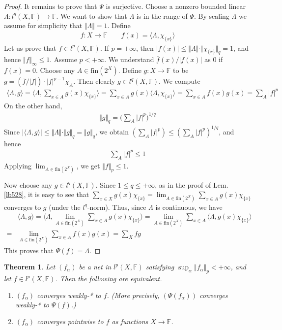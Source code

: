 \documentclass[12pt,b5paper,notitlepage]{article}
\theoremstyle{definition}
\theoremstyle{plain}
\newtheorem{thm}[df]{Theorem}
\newcommand{\ovl}{\overline}
\newcommand{\bk}[1]{\langle {#1}\rangle}
\newcommand{\bigbk}[1]{\big\langle {#1}\big\rangle}
\newcommand{\Bigbk}[1]{\Big\langle {#1}\Big\rangle}
\newcommand{\fin}{\mathrm{fin}}
\newcommand{\Fbb}{\mathbb F}
\numberwithin{equation}{section}
\begin{document}
\begin{proof}
It remains to prove that $\Psi$ is surjective. Choose a nonzero bounded linear $\Lambda:l^q(X,\Fbb)\rightarrow\Fbb$. We want to show that $\Lambda$ is in the range of $\Psi$. By scaling $\Lambda$ we assume for simplicity that $\Vert\Lambda\Vert=1$.  Define 
\begin{align}
f:X\rightarrow\Fbb\qquad  f(x)=\bk{\Lambda,\chi_{\{x\}}}
\end{align}
Let us prove that $f\in l^p(X,\Fbb)$. If $p=+\infty$, then $|f(x)|\leq \Vert\Lambda\Vert\cdot\Vert\chi_{\{x\}}\Vert_q=1$, and hence $\Vert f\Vert_\infty\leq 1$. Assume $p<+\infty$. We understand $\ovl f(x)/|f(x)|$ as $0$ if $f(x)=0$. Choose any $A\in\fin(2^X)$. Define $g:X\rightarrow\Fbb$ to be $g=(\ovl f/|f|)\cdot |f|^{p-1}\chi_A$. Then clearly $g\in l^q(X,\Fbb)$. We compute
\begin{align*}
\bk{\Lambda,g}=\bigbk{\Lambda,\sum_{x\in A}g(x)\chi_{\{x\}}}=\sum_{x\in A}g(x)\bk{\Lambda,\chi_{\{x\}}}=\sum_{x\in A}f(x)g(x)=\sum_A|f|^p
\end{align*}
On the other hand,
\begin{align*}
\Vert g\Vert_q=\Big(\sum_A|f|^p \Big)^{1/q}
\end{align*}
Since $|\bk{\Lambda,g}|\leq \Vert\Lambda\Vert\cdot\Vert g\Vert_q=\Vert g\Vert_q$, we obtain $(\sum_A|f|^p)\leq (\sum_A|f|^p)^{1/q}$, and hence 
\begin{align*}
\sum_A |f|^p\leq 1
\end{align*}
Applying $\lim_{A\in\fin(2^X)}$, we get $\Vert f\Vert_p\leq 1$.

Now choose any $g\in l^q(X,\Fbb)$. Since $1\leq q\leq +\infty$, as in the proof of Lem. \ref{lb528}, it is easy to see that $\sum_{x\in X}g(x)\chi_{\{x\}}=\lim_{A\in\fin(2^X)}\sum_{x\in A}g(x)\chi_{\{x\}}$ converges to $g$ (under the $l^q$-norm). Thus, since $\Lambda$ is continuous, we have
\begin{align*}
&\bk{\Lambda,g}=\Bigbk{\Lambda,\lim_{A\in\fin(2^X)}\sum_{x\in A}g(x)\chi_{\{x\}}}=\lim_{A\in\fin(2^X)}\sum_{x\in A}\Bigbk{\Lambda,g(x)\chi_{\{x\}}}\\
=&\lim_{A\in\fin(2^X)}\sum_{x\in A}f(x)g(x)=\sum_X fg
\end{align*}
This proves that $\Psi(f)=\Lambda$.
\end{proof}



\begin{thm}\label{lb530}
Let $(f_\alpha)$ be a net in $l^p(X,\Fbb)$ satisfying $\sup_\alpha\Vert f_\alpha\Vert_p<+\infty$, and let $f\in l^p(X,\Fbb)$. Then the following are equivalent.
\begin{enumerate}[label=(\arabic*)]
\item $(f_\alpha)$ converges weakly-* to $f$. (More precisely, $(\Psi(f_\alpha))$ converges weakly-* to $\Psi(f)$.)
\item $(f_\alpha)$ converges pointwise to $f$ as functions $X\rightarrow\Fbb$.
\end{enumerate}
\end{thm}
\end{document}

